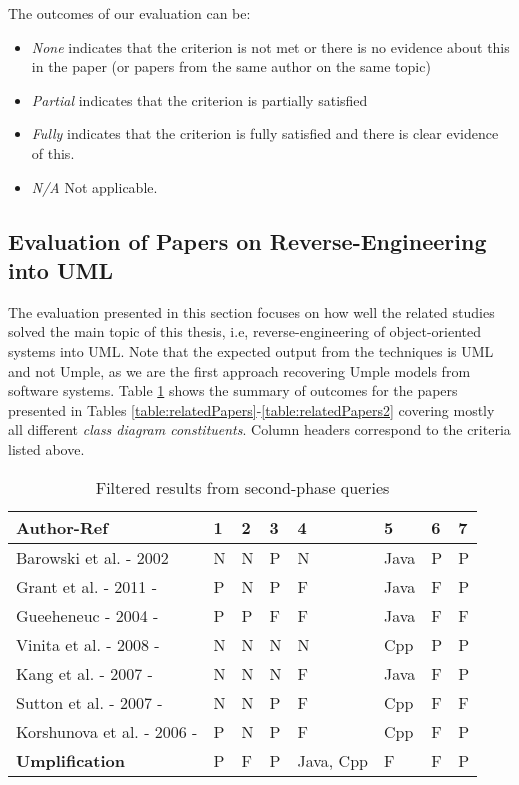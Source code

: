 The outcomes of our evaluation can be:
\begin{itemize}
\item \textit{None} indicates that the criterion is not met or there is no evidence about this in the paper (or papers from the same author on the same topic)

\item \textit{Partial} indicates that the criterion is partially satisfied

\item \textit{Fully} indicates that the criterion is fully satisfied and there is clear evidence of this.

\item \textit{N/A}  Not applicable. 
\end{itemize}

\subsection{Evaluation of Papers on Reverse-Engineering into UML}

The evaluation presented in this section focuses on how well the related studies solved the main topic of this thesis, i.e, reverse-engineering of object-oriented systems into UML. Note that the expected output from the techniques is UML and not Umple, as we are the first approach recovering Umple models from software systems.
Table \ref{table:finalResults} shows the summary of outcomes for the papers presented in Tables \ref{table:relatedPapers}-\ref{table:relatedPapers2} covering mostly all different \textit{class diagram constituents}. Column headers correspond to the criteria listed above. 

\begin{table}[ht]
\caption{Filtered results from second-phase queries}
\label{table:finalResults}
\centering
\begin{tabularx}{\textwidth}{X|lllllll}
\toprule
\rowcolor[HTML]{BBDAFF}
\textbf{Author-Ref}  & \textbf{1} & \textbf{2}& \textbf{3}& \textbf{4}& \textbf{5} & \textbf{6}& \textbf{7} \\ \hline
Barowski et al. - 2002 \cite{Barowski} & N & N & P & N & Java  & P & P \\ \hline
Grant et al. - 2011 - \cite{grant2011reverse} & P  & N & P &  F & Java  & F & P \\ \hline
Gueeheneuc - 2004 - \cite{GueheneucSystematic} & P & P& F  & F &Java  & F & F \\ \hline
Vinita et al. - 2008 - \cite{Vinita2008} & N & N & N & N & Cpp & P & P \\ \hline
Kang et al. - 2007 - \cite{Kang2007} & N & N& N & F &Java & F & P \\ \hline
Sutton et al. - 2007 -  \cite{Sutton2007} & N & N & P & F & Cpp & F & F\\ \hline
Korshunova et al. - 2006 - \cite{cpp2xmi} & P & N & P & F & Cpp & F & P\\ \hline
\textbf{Umplification} & P & F& P & Java, Cpp & F & F & P\\ \hline
\end{tabularx}
\end{table}

